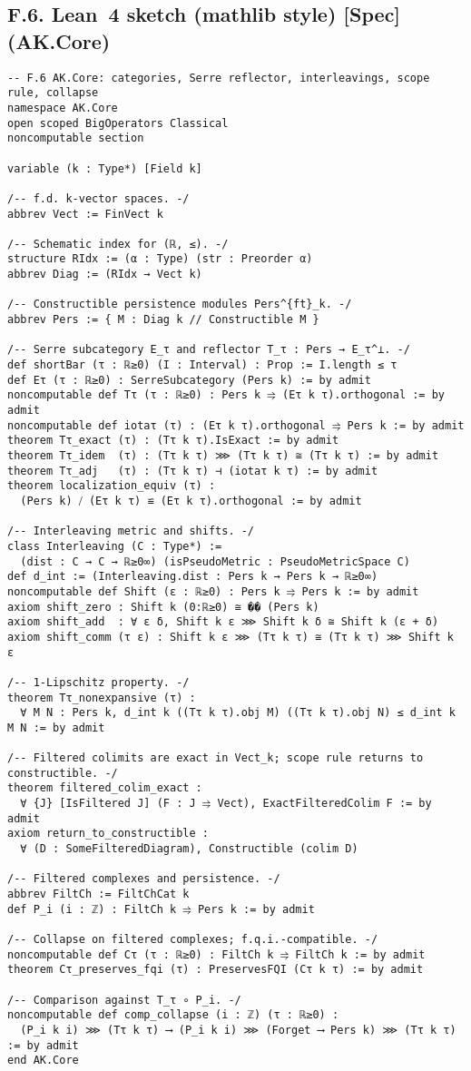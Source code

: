 \documentclass[11pt]{article}
\numberwithin{equation}{section}
\theoremstyle{plain}
\theoremstyle{definition}
\theoremstyle{remark}
\theoremstyle{plain}
\theoremstyle{definition}
\numberwithin{equation}{section}
\theoremstyle{definition}
\numberwithin{equation}{section}
\theoremstyle{plain}
\theoremstyle{definition}
\theoremstyle{remark}
\begin{document}
\subsection*{F.6. Lean~4 sketch (mathlib style) [Spec] (AK.Core)}

\begin{verbatim}
-- F.6 AK.Core: categories, Serre reflector, interleavings, scope rule, collapse
namespace AK.Core
open scoped BigOperators Classical
noncomputable section

variable (k : Type*) [Field k]

/-- f.d. k-vector spaces. -/
abbrev Vect := FinVect k

/-- Schematic index for (ℝ, ≤). -/
structure RIdx := (α : Type) (str : Preorder α)
abbrev Diag := (RIdx → Vect k)

/-- Constructible persistence modules Pers^{ft}_k. -/
abbrev Pers := { M : Diag k // Constructible M }

/-- Serre subcategory E_τ and reflector T_τ : Pers → E_τ^⊥. -/
def shortBar (τ : ℝ≥0) (I : Interval) : Prop := I.length ≤ τ
def Eτ (τ : ℝ≥0) : SerreSubcategory (Pers k) := by admit
noncomputable def Tτ (τ : ℝ≥0) : Pers k ⥤ (Eτ k τ).orthogonal := by admit
noncomputable def iotaτ (τ) : (Eτ k τ).orthogonal ⥤ Pers k := by admit
theorem Tτ_exact (τ) : (Tτ k τ).IsExact := by admit
theorem Tτ_idem  (τ) : (Tτ k τ) ⋙ (Tτ k τ) ≅ (Tτ k τ) := by admit
theorem Tτ_adj   (τ) : (Tτ k τ) ⊣ (iotaτ k τ) := by admit
theorem localization_equiv (τ) :
  (Pers k) ⧸ (Eτ k τ) ≌ (Eτ k τ).orthogonal := by admit

/-- Interleaving metric and shifts. -/
class Interleaving (C : Type*) :=
  (dist : C → C → ℝ≥0∞) (isPseudoMetric : PseudoMetricSpace C)
def d_int := (Interleaving.dist : Pers k → Pers k → ℝ≥0∞)
noncomputable def Shift (ε : ℝ≥0) : Pers k ⥤ Pers k := by admit
axiom shift_zero : Shift k (0:ℝ≥0) ≅ �� (Pers k)
axiom shift_add  : ∀ ε δ, Shift k ε ⋙ Shift k δ ≅ Shift k (ε + δ)
axiom shift_comm (τ ε) : Shift k ε ⋙ (Tτ k τ) ≅ (Tτ k τ) ⋙ Shift k ε

/-- 1-Lipschitz property. -/
theorem Tτ_nonexpansive (τ) :
  ∀ M N : Pers k, d_int k ((Tτ k τ).obj M) ((Tτ k τ).obj N) ≤ d_int k M N := by admit

/-- Filtered colimits are exact in Vect_k; scope rule returns to constructible. -/
theorem filtered_colim_exact :
  ∀ {J} [IsFiltered J] (F : J ⥤ Vect), ExactFilteredColim F := by admit
axiom return_to_constructible :
  ∀ (D : SomeFilteredDiagram), Constructible (colim D)

/-- Filtered complexes and persistence. -/
abbrev FiltCh := FiltChCat k
def P_i (i : ℤ) : FiltCh k ⥤ Pers k := by admit

/-- Collapse on filtered complexes; f.q.i.-compatible. -/
noncomputable def Cτ (τ : ℝ≥0) : FiltCh k ⥤ FiltCh k := by admit
theorem Cτ_preserves_fqi (τ) : PreservesFQI (Cτ k τ) := by admit

/-- Comparison against T_τ ∘ P_i. -/
noncomputable def comp_collapse (i : ℤ) (τ : ℝ≥0) :
  (P_i k i) ⋙ (Tτ k τ) ⟶ (P_i k i) ⋙ (Forget ⟶ Pers k) ⋙ (Tτ k τ) := by admit
end AK.Core
\end{verbatim}
\end{document}
